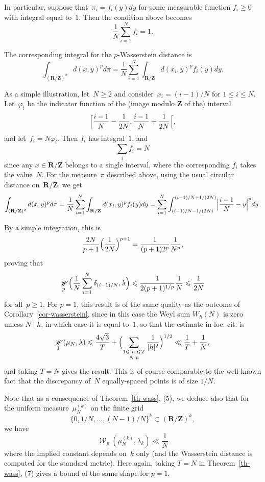 \documentclass[12pt]{amsart}
\renewcommand{\mathcal}{\mathscr}
\renewcommand{\leq}{\leqslant}
\renewcommand{\geq}{\geqslant}
\newcommand{\Zz}{\mathbf{Z}}
\newcommand{\Rr}{\mathbf{R}}
\DeclareMathOperator{\wass}{\mathcal{W}}
\theoremstyle{plain}
\theoremstyle{remark}
\theoremstyle{definition}
\renewcommand{\geq}{\geqslant}
\renewcommand{\leq}{\leqslant}
\begin{document}
In particular, suppose that~$\pi_i=f_i(y)dy$ for some measurable
function $f_i\geq 0$ with integral equal to~$1$. Then the condition
above becomes
\[
  \frac{1}{N}\sum_{i=1}^Nf_i=1.
\]

The corresponding integral for the $p$-Wasserstein distance is
\[
  \int_{(\Rr/\Zz)^2}d(x,y)^pd\pi=
  \frac{1}{N}\sum_{i=1}^N \int_{\Rr/\Zz}d(x_i,y)^pf_i(y)dy.
\]


As a simple illustration, let~$N\geq 2$ and consider~$x_i=(i-1)/N$
for $1\leq i\leq N$. Let~$\varphi_i$ be the indicator function of
the (image modulo $\Zz$ of the) interval
\[
  \Bigl[\frac{i-1}{N}-\frac{1}{2N},
  \frac{i-1}{N}+\frac{1}{2N}\Bigr[,
\]
and let~$f_i=N\varphi_i$. Then $f_i$ has integral~$1$, and
\[
  \sum_i f_i=N
\]
since any $x\in\Rr/\Zz$ belongs to a single interval, where the
corresponding $f_i$ takes the value~$N$. For the measure~$\pi$
described above, using the usual circular distance on~$\Rr/\Zz$, we
get
\[
  \int_{(\Rr/\Zz)^2}d(x,y)^pd\pi= \frac{1}{N}\sum_{i=1}^N
  \int_{\Rr/\Zz}d(x_i,y)^pf_i(y)dy=
  \sum_{i=1}^N\int_{(i-1)/N-1/(2N)}^{(i-1)/N+1/(2N)}
  \Bigl|\frac{i-1}{N}-y\Bigr|^pdy.
\]

By a simple integration, this is
\[
  \frac{2N}{p+1}\Bigl(\frac{1}{2N}\Bigr)^{p+1}=
  \frac{1}{(p+1)2^p}\frac{1}{N^p},
\]
proving that
\[
  \wass_p\Bigl(\frac{1}{N}\sum_{i=1}^N\delta_{(i-1)/N},\lambda\Bigr)
  \leq \frac{1}{2(p+1)^{1/p}}\frac{1}{N}\leq\frac{1}{2N}
\]
for all~$p\geq 1$. For $p=1$, this result is of the same quality as
the outcome of Corollary~\ref{cor-wasserstein}, since in this case the
Weyl sum $W_h(N)$ is zero unless $N\mid h$, in which case it is equal
to~$1$, so that the estimate in loc. cit. is
\[
  \wass_1(\mu_N,\lambda)\leq \frac{4\sqrt{3}}{T}+
  \Bigl(\sum_{\substack{1\leq |h|\leq T\\ N\mid
      h}}\frac{1}{|h|^2}\Big)^{1/2} \ll \frac{1}{T}+\frac{1}{N},
\]
and taking $T=N$ gives the result. This is of course comparable to the
well-known fact that the discrepancy of~$N$ equally-spaced points is of
size $1/N$.

Note that as a consequence of Theorem~\ref{th-wass}, (5), we deduce
also that for the uniform measure~$\mu_{N}^{(k)}$ on the finite grid
\[
  \{0, 1/N,\ldots, (N-1)/N\}^k\subset (\Rr/\Zz)^k,
\]
we have
\[
  \wass_p(\mu_N^{(k)},\lambda_k)\ll \frac{1}{N}
\]
where the implied constant depends on~$k$ only (and the Wasserstein
distance is computed for the standard metric).  Here again, taking
$T=N$ in Theorem~\ref{th-wass}, (7) gives a bound of the same shape
for $p=1$.
\end{document}
